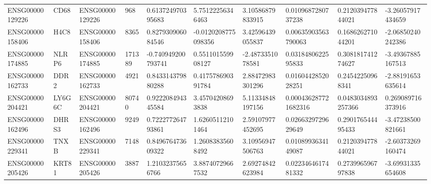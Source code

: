 \begin{tabular}{@{}llllllllll@{}}
ENSG00000129226 & CD68 & ENSG00000129226 & 968 & 0.613724970395683 & 5.75122256346463 & 3.10586879833915 & 0.0109687280737238 & 0.212039477844021 & -3.26057917434659 \\
ENSG00000158406 & H4C8 & ENSG00000158406 & 8365 & 0.827930906084546 & -0.0120208775098356 & 3.42596439055837 & 0.00635903563790063 & 0.168626271044201 & -2.06850240242386 \\
ENSG00000174885 & NLRP6 & ENSG00000174885 & 171389 & -0.740949200793741 & 0.551101559908127 & -2.4873351078581 & 0.0318480622595833 & 0.308181741274627 & -3.49367885167513 \\
ENSG00000162733 & DDR2 & ENSG00000162733 & 4921 & 0.843314379880288 & 0.417578690391784 & 2.88472983301296 & 0.0160442852028251 & 0.24542250968341 & -2.88191653635614 \\
ENSG00000204421 & LY6G6C & ENSG00000204421 & 80740 & 0.922208494345584 & 3.45704208693838 & 5.11334848197156 & 0.000436287721682316 & 0.0483034893257366 & 0.269089716373916 \\
ENSG00000162496 & DHRS3 & ENSG00000162496 & 9249 & 0.722277264793861 & 1.62605112101464 & 2.59107977452695 & 0.0266329729629649 & 0.290176544495433 & -3.47238500821661 \\
ENSG00000229341 & TNXB & ENSG00000229341 & 7148 & 0.849676473609322 & 1.26083835608492 & 3.10956947506763 & 0.0108993634149087 & 0.212039477844021 & -2.60373269160474 \\
ENSG00000205426 & KRT81 & ENSG00000205426 & 3887 & 1.21032375656766 & 3.88740729667532 & 2.69274842623984 & 0.0223464617481332 & 0.273996596797838 & -3.69931335654608 \\
\bottomrule
\end{tabular}
\endgroup
